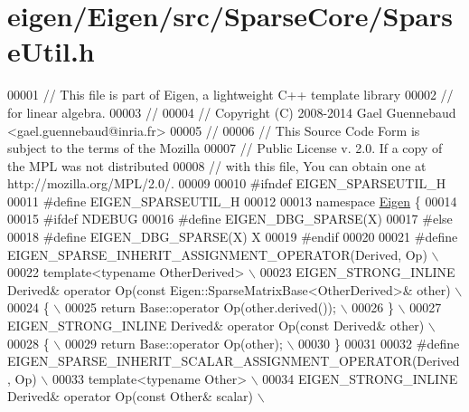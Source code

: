 \hypertarget{eigen_2_eigen_2src_2_sparse_core_2_sparse_util_8h_source}{}\section{eigen/\+Eigen/src/\+Sparse\+Core/\+Sparse\+Util.h}
\label{eigen_2_eigen_2src_2_sparse_core_2_sparse_util_8h_source}

\begin{DoxyCode}
00001 \textcolor{comment}{// This file is part of Eigen, a lightweight C++ template library}
00002 \textcolor{comment}{// for linear algebra.}
00003 \textcolor{comment}{//}
00004 \textcolor{comment}{// Copyright (C) 2008-2014 Gael Guennebaud <gael.guennebaud@inria.fr>}
00005 \textcolor{comment}{//}
00006 \textcolor{comment}{// This Source Code Form is subject to the terms of the Mozilla}
00007 \textcolor{comment}{// Public License v. 2.0. If a copy of the MPL was not distributed}
00008 \textcolor{comment}{// with this file, You can obtain one at http://mozilla.org/MPL/2.0/.}
00009 
00010 \textcolor{preprocessor}{#ifndef EIGEN\_SPARSEUTIL\_H}
00011 \textcolor{preprocessor}{#define EIGEN\_SPARSEUTIL\_H}
00012 
00013 \textcolor{keyword}{namespace }\hyperlink{namespace_eigen}{Eigen} \{ 
00014 
00015 \textcolor{preprocessor}{#ifdef NDEBUG}
00016 \textcolor{preprocessor}{#define EIGEN\_DBG\_SPARSE(X)}
00017 \textcolor{preprocessor}{#else}
00018 \textcolor{preprocessor}{#define EIGEN\_DBG\_SPARSE(X) X}
00019 \textcolor{preprocessor}{#endif}
00020 
00021 \textcolor{preprocessor}{#define EIGEN\_SPARSE\_INHERIT\_ASSIGNMENT\_OPERATOR(Derived, Op) \(\backslash\)}
00022 \textcolor{preprocessor}{template<typename OtherDerived> \(\backslash\)}
00023 \textcolor{preprocessor}{EIGEN\_STRONG\_INLINE Derived& operator Op(const Eigen::SparseMatrixBase<OtherDerived>& other) \(\backslash\)}
00024 \textcolor{preprocessor}{\{ \(\backslash\)}
00025 \textcolor{preprocessor}{  return Base::operator Op(other.derived()); \(\backslash\)}
00026 \textcolor{preprocessor}{\} \(\backslash\)}
00027 \textcolor{preprocessor}{EIGEN\_STRONG\_INLINE Derived& operator Op(const Derived& other) \(\backslash\)}
00028 \textcolor{preprocessor}{\{ \(\backslash\)}
00029 \textcolor{preprocessor}{  return Base::operator Op(other); \(\backslash\)}
00030 \textcolor{preprocessor}{\}}
00031 
00032 \textcolor{preprocessor}{#define EIGEN\_SPARSE\_INHERIT\_SCALAR\_ASSIGNMENT\_OPERATOR(Derived, Op) \(\backslash\)}
00033 \textcolor{preprocessor}{template<typename Other> \(\backslash\)}
00034 \textcolor{preprocessor}{EIGEN\_STRONG\_INLINE Derived& operator Op(const Other& scalar) \(\backslash\)}

\end{DoxyCode}
